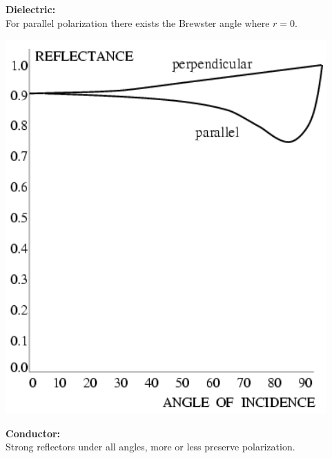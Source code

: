 \documentclass[a4paper, fontsize=8pt, landscape, DIV=1]{scrartcl}
\begin{document}
\begin{multicols*}{4}
		\begin{minipage}[b]{0.49\columnwidth}
			\begin{flushleft}
				\textbf{Dielectric:}\\
				For parallel polarization there exists the Brewster angle where $r=0$.
				\vspace{1.2cm}
			\end{flushleft}
		\end{minipage}
		\par 
		\begin{minipage}[t]{0.49\columnwidth}
			\begin{flushleft}
				\includegraphics[width=\columnwidth]{images/Introduction/refl_metal.png}\\
			\end{flushleft}
		\end{minipage}
		\begin{minipage}[b]{0.49\columnwidth}
			\begin{flushleft}
				\textbf{Conductor:}\\
				Strong reflectors under all angles, more or less preserve polarization.
				\vspace{1.2cm}
			\end{flushleft}
		\end{minipage}
	

\end{multicols*}
\end{document}
